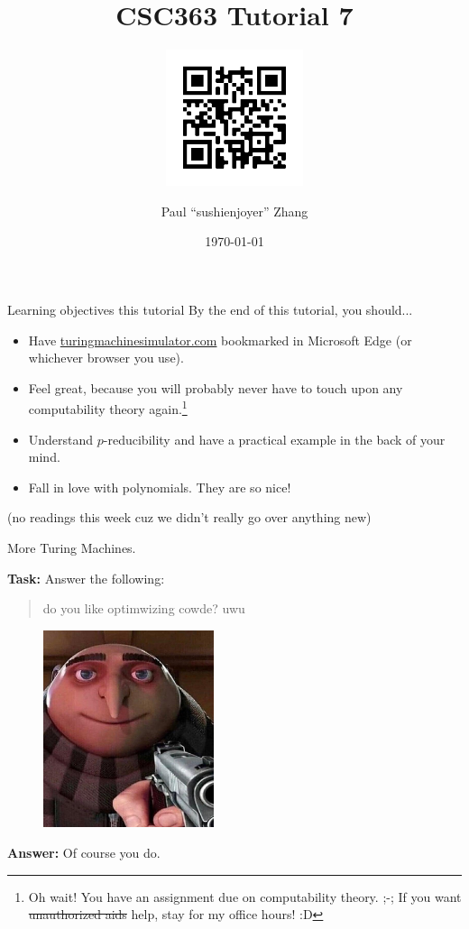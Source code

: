 \documentclass{beamer}
\title{CSC363 Tutorial 7}
\subtitle{\includegraphics[width=4cm]{img/qr.png}}
\date{\today}
\author{Paul ``sushi{\textunderscore}enjoyer'' Zhang}
\institute{University of Humongus Chungus Amogus}
\begin{document}
\maketitle

\begin{frame}{Learning objectives this tutorial}
By the end of this tutorial, you should...
\begin{itemize}
\item Have \url{turingmachinesimulator.com} bookmarked in Microsoft Edge (or whichever browser you use).
\item Feel great, because you will probably never have to touch upon any computability theory again.\footnote{Oh wait! You have an assignment due on computability theory. ;-;
If you want \sout{unauthorized aids} help, stay for my office hours! :D}
\item Understand $p$-reducibility and have a practical example in the back of your mind.
\item Fall in love with polynomials. They are so nice!
\end{itemize}
(no readings this week cuz we didn't really go over anything new)
\end{frame}

\begin{frame}{More Turing Machines. \emojimoyai}

\textbf{Task:} Answer the following:
\begin{quote}
do you like optimwizing cowde? uwu
\end{quote}

\begin{figure}[h]
\centering
\includegraphics[width=5cm]{img/gru.jpg}
\end{figure}

\pause

\textbf{Answer:} Of course you do.


\end{frame}
\end{document}
